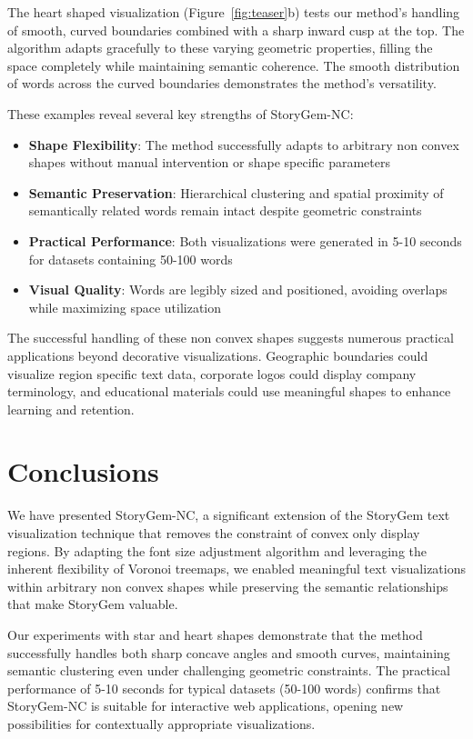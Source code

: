 \documentclass{vgtc}                          %
\begin{document}
The heart shaped visualization (Figure~\ref{fig:teaser}b) tests our method's handling of smooth, curved boundaries combined with a sharp inward cusp at the top.
The algorithm adapts gracefully to these varying geometric properties, filling the space completely while maintaining semantic coherence.
The smooth distribution of words across the curved boundaries demonstrates the method's versatility.

These examples reveal several key strengths of StoryGem-NC:
\begin{itemize}
  \item \textbf{Shape Flexibility}: The method successfully adapts to arbitrary non convex shapes without manual intervention or shape specific parameters
  \item \textbf{Semantic Preservation}: Hierarchical clustering and spatial proximity of semantically related words remain intact despite geometric constraints
  \item \textbf{Practical Performance}: Both visualizations were generated in 5-10 seconds for datasets containing 50-100 words
  \item \textbf{Visual Quality}: Words are legibly sized and positioned, avoiding overlaps while maximizing space utilization
\end{itemize}

The successful handling of these non convex shapes suggests numerous practical applications beyond decorative visualizations.
Geographic boundaries could visualize region specific text data, corporate logos could display company terminology, and educational materials could use meaningful shapes to enhance learning and retention.

\section{Conclusions}

We have presented StoryGem-NC, a significant extension of the StoryGem text visualization technique that removes the constraint of convex only display regions.
By adapting the font size adjustment algorithm and leveraging the inherent flexibility of Voronoi treemaps, we enabled meaningful text visualizations within arbitrary non convex shapes while preserving the semantic relationships that make StoryGem valuable.

Our experiments with star and heart shapes demonstrate that the method successfully handles both sharp concave angles and smooth curves, maintaining semantic clustering even under challenging geometric constraints.
The practical performance of 5-10 seconds for typical datasets (50-100 words) confirms that StoryGem-NC is suitable for interactive web applications, opening new possibilities for contextually appropriate visualizations.
\end{document}
